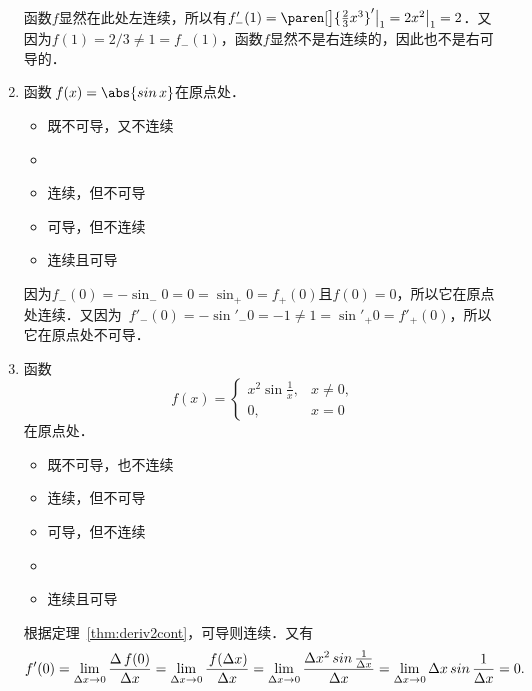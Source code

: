 \begin{enumerate}
  \ifshowsol
    函数\(f\)显然在此处左连续，所以有\(f'_-(1) = \paren[\big]{\frac23 x^3}'\big\vert_1 = 2x^2\big\vert_1 = 2\)．又因为\(f(1) = 2/3 \ne 1 = f_-(1)\)，函数\(f\)显然不是右连续的，因此也不是右可导的．
  \fi

\item 函数\(\,f(x) = \abs{\sin x}\)在原点处\uline{\hspace{8em}}．
  \begin{itemize}
    \renewcommand{\labelitemi}{\faCircleThin}
  \item 既不可导，又不连续
    \ifshowsol
    \item[\faCircle]
    \else
    \item
    \fi
    连续，但不可导
  \item 可导，但不连续
  \item 连续且可导
  \end{itemize}

  \ifshowsol
    因为\(f_-(0) = -\sin_-0 = 0 = \sin_+0 = f_+(0)\)且\(f(0) = 0\)，所以它在原点处连续．又因为~\(f'_-(0) = -\sin'_-0 = -1 \ne 1 = \sin'_+0 = f'_+(0)\)，所以它在原点处不可导．
  \fi

\item \label{B1.4.1.E4}函数
  \begin{equation*}
    f(x) =
    \begin{cases}
      x^2 \sin\frac1x, & x \ne 0, \\
      0, & x = 0
    \end{cases}
  \end{equation*}
  在原点处\uline{\hspace{8em}}．
  \begin{itemize}
    \renewcommand{\labelitemi}{\faCircleThin}
  \item 既不可导，也不连续
  \item 连续，但不可导
  \item 可导，但不连续
    \ifshowsol
    \item[\faCircle]
    \else
    \item
    \fi
    连续且可导
  \end{itemize}

  \ifshowsol
    根据定理~\ref{thm:deriv2cont}，可导则连续．又有
    \begin{equation*}
      f'(0)
      = \lim_{\fdx\to0} \frac{\fwdf\,f(0)}{\fdx}
      = \lim_{\fdx\to0} \frac{\,f(\fdx)}{\fdx}
      = \lim_{\fdx\to0} \frac{\fdx^2 \sin\frac1\fdx}{\fdx}
      = \lim_{\fdx\to0} \fdx \sin\frac1\fdx
      = 0.
    \end{equation*}
  \fi


\end{enumerate}

